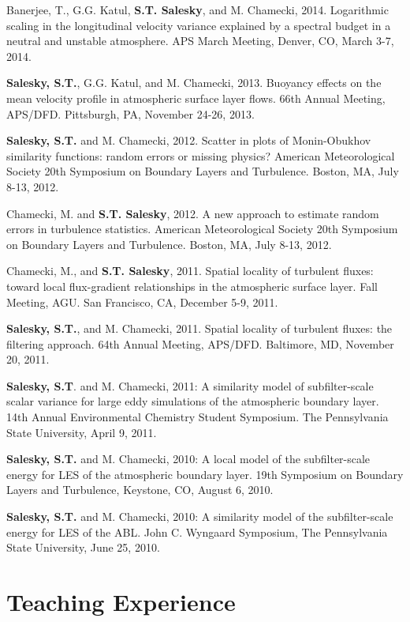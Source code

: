\documentclass[11pt,letterpaper]{article}
\begin{document}
Banerjee, T., G.G. Katul, \textbf{S.T. Salesky}, and M. Chamecki, 2014. Logarithmic scaling in the longitudinal velocity variance explained by a spectral budget in a neutral and unstable atmosphere. APS March Meeting, Denver, CO, March 3-7, 2014. 

\textbf{Salesky, S.T.}, G.G. Katul, and M. Chamecki, 2013. Buoyancy effects on the mean velocity profile in atmospheric surface layer flows. 66th Annual Meeting, APS/DFD. Pittsburgh, PA, November 24-26, 2013. 

\textbf{Salesky, S.T.} and M. Chamecki, 2012. Scatter in plots of Monin-Obukhov similarity functions: random errors or missing physics? American Meteorological Society 20th Symposium on Boundary Layers and Turbulence. Boston, MA, July 8-13, 2012. 

Chamecki, M. and \textbf{S.T. Salesky}, 2012. A new approach to estimate random errors in turbulence statistics. American Meteorological Society 20th Symposium on Boundary Layers and Turbulence. Boston, MA, July 8-13, 2012. 

Chamecki, M., and \textbf{S.T. Salesky}, 2011. Spatial locality of turbulent fluxes: toward local flux-gradient relationships in the atmospheric surface layer. Fall Meeting, AGU. San Francisco, CA, December 5-9, 2011. 

\textbf{Salesky, S.T.}, and M. Chamecki, 2011. Spatial locality of turbulent fluxes: the filtering approach. 64th Annual Meeting, APS/DFD. Baltimore, MD, November 20, 2011. 

\textbf{Salesky, S.T}. and M. Chamecki, 2011: A similarity model of subfilter-scale scalar variance for large eddy simulations of the atmospheric boundary layer. 14th Annual Environmental Chemistry Student Symposium. The Pennsylvania State University, April 9, 2011. 

\textbf{Salesky, S.T.} and M. Chamecki, 2010: A local model of the subfilter-scale energy for LES of the atmospheric boundary layer. 19th Symposium on Boundary Layers and Turbulence, Keystone, CO, August 6, 2010. 

\textbf{Salesky, S.T.} and M. Chamecki, 2010: A similarity model of the subfilter-scale energy for LES of the ABL. John C. Wyngaard Symposium, The Pennsylvania State University, June 25, 2010. 

\section*{Teaching Experience} 
\end{document}
